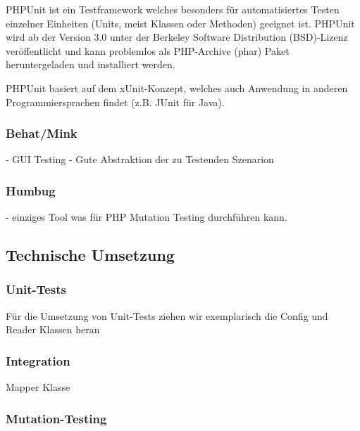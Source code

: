 PHPUnit ist ein Testframework welches besonders für automatisiertes Testen einzelner Einheiten (Units, meist Klassen oder Methoden) geeignet ist. PHPUnit wird ab
der Version 3.0 unter der Berkeley Software Distribution (BSD)-Lizenz veröffentlicht und kann problemlos als PHP-Archive (phar) Paket heruntergeladen und installiert
werden.

PHPUnit basiert auf dem xUnit-Konzept, welches auch Anwendung in anderen Programmiersprachen findet (z.B. JUnit für Java).

\subsubsection{Behat/Mink}
- GUI Testing
- Gute Abstraktion der zu Testenden Szenarion


\subsubsection{Humbug}
- einziges Tool was für PHP Mutation Testing durchführen kann.


\subsection{Technische Umsetzung}
\subsubsection{Unit-Tests}
Für die Umsetzung von Unit-Tests ziehen wir exemplarisch die Config und Reader Klassen heran


\subsubsection{Integration}

Mapper Klasse

\subsubsection{Mutation-Testing}

